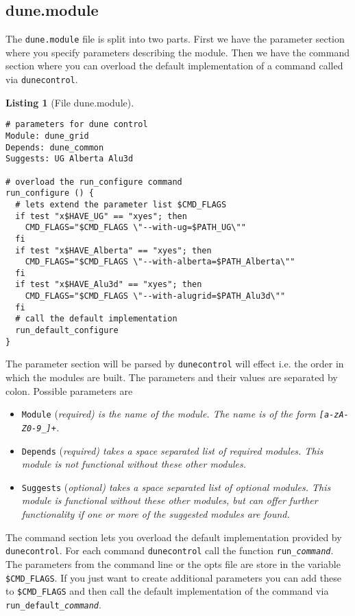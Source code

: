 \documentclass[11pt,a4paper,headinclude,footinclude,DIV16,normalheadings]{scrartcl}
\newtheorem{lst}{Listing}
\newcommand{\dunecontrol}{\texttt{dunecontrol}\xspace}
\newcommand{\dunemodule}{\texttt{dune.module}\xspace}
\begin{document}
\subsection{dune.module}\label{subsec::dune.module}

The \dunemodule file is split into two parts. First we have the
parameter section where you specify parameters describing the module.
Then we have the command section where you can overload the default
implementation of a command called via \dunecontrol.

\begin{lst}[File dune.module] \mbox{}
\begin{lstlisting}
# parameters for dune control
Module: dune_grid
Depends: dune_common
Suggests: UG Alberta Alu3d

# overload the run_configure command
run_configure () {
  # lets extend the parameter list $CMD_FLAGS
  if test "x$HAVE_UG" == "xyes"; then
    CMD_FLAGS="$CMD_FLAGS \"--with-ug=$PATH_UG\""
  fi
  if test "x$HAVE_Alberta" == "xyes"; then
    CMD_FLAGS="$CMD_FLAGS \"--with-alberta=$PATH_Alberta\""
  fi  
  if test "x$HAVE_Alu3d" == "xyes"; then
    CMD_FLAGS="$CMD_FLAGS \"--with-alugrid=$PATH_Alu3d\""
  fi
  # call the default implementation
  run_default_configure
}
\end{lstlisting}
\end{lst}

The parameter section will be parsed by \dunecontrol will effect
i.e. the order in which the modules are built. The parameters and
their values are separated by colon. Possible parameters are
\begin{itemize}
\item \texttt{Module} (\em required\em) is the name of the module. The
  name is of the form \texttt{[a-zA-Z0-9\_]+}.
\item \texttt{Depends} (\em required\em) takes a space separated list
  of required modules. This module is not functional without these
  other modules.
\item \texttt{Suggests} (\em optional\em) takes a space separated list
  of optional modules. This module is functional without these
  other modules, but can offer further functionality if one or more of
  the suggested modules are found.
\end{itemize}

The command section lets you overload the default implementation
provided by \dunecontrol. For each command \dunecontrol call the
function \texttt{run\_\textit{command}}. The parameters from the
command line or the opts file are store in the variable
\texttt{\$CMD\_FLAGS}. If you just want to create additional parameters
you can add these to \texttt{\$CMD\_FLAGS} and then call the default
implementation of the command via
\texttt{run\_default\_\textit{command}}.
\end{document}
